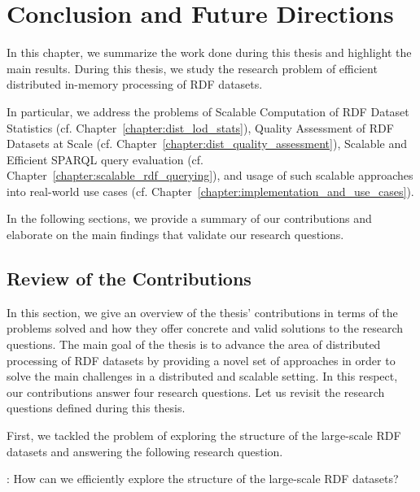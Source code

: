 \chapter{Conclusion and Future Directions}
\label{chapter:conclusion}

In this chapter, we summarize the work done during this thesis and highlight the main results.
During this thesis, we study the research problem of efficient distributed in-memory processing of \gls{RDF} datasets.

In particular, we address the problems of Scalable Computation of \gls{RDF} Dataset Statistics (cf. Chapter~\ref{chapter:dist_lod_stats}), Quality Assessment of \gls{RDF} Datasets at Scale (cf. Chapter~\ref{chapter:dist_quality_assessment}), Scalable and Efficient \gls{SPARQL} query evaluation (cf. Chapter~\ref{chapter:scalable_rdf_querying}), and usage of such scalable approaches into real-world use cases (cf. Chapter~\ref{chapter:implementation_and_use_cases}).

In the following sections, we provide a summary of our contributions and elaborate on the main findings that validate our research questions.

\section{Review of the Contributions}
In this section, we give an overview of the thesis' contributions in terms of the problems solved and how they offer concrete and valid solutions to the research questions.
The main goal of the thesis is to advance the area of distributed processing of \gls{RDF} datasets by providing a novel set of approaches in order to solve the main challenges in a distributed and scalable setting.
In this respect, our contributions answer four research questions.
Let us revisit the research questions defined during this thesis.

First, we tackled the problem of exploring the structure of the large-scale \gls{RDF} datasets and answering the following research question.

\begin{tcolorbox}
\textbf{\rqNr[RQ1]\label{rqc:1}}: How can we efficiently explore the structure of the large-scale \gls{RDF} datasets?
\end{tcolorbox}

